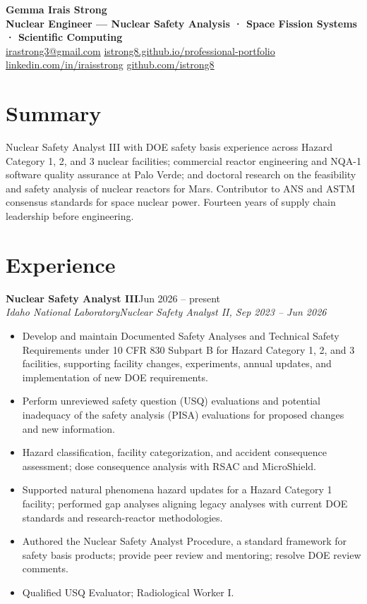 \documentclass[10pt,letterpaper]{article}
\newcommand{\role}[4]{%
  \textbf{#1}\hfill{\color{muted}#3}\\
  {\itshape #2}\hfill{\color{muted}\itshape #4}\par\vspace{1pt}}
\begin{document}
{\LARGE\bfseries Gemma Irais Strong}\\[2pt]
{\color{accent}\bfseries Nuclear Engineer — Nuclear Safety Analysis · Space Fission Systems · Scientific Computing}\\[3pt]
{\small
\href{mailto:irastrong3@gmail.com}{irastrong3@gmail.com} \textbar{}
\href{https://istrong8.github.io/professional-portfolio/}{istrong8.github.io/professional-portfolio} \textbar{}
\href{https://www.linkedin.com/in/iraisstrong/}{linkedin.com/in/iraisstrong} \textbar{}
\href{https://github.com/istrong8}{github.com/istrong8}}

\section{Summary}
Nuclear Safety Analyst III with DOE safety basis experience across Hazard Category 1, 2, and 3 nuclear facilities; commercial reactor engineering and NQA-1 software quality assurance at Palo Verde; and doctoral research on the feasibility and safety analysis of nuclear reactors for Mars. Contributor to ANS and ASTM consensus standards for space nuclear power. Fourteen years of supply chain leadership before engineering.

\section{Experience}
\role{Nuclear Safety Analyst III}{Idaho National Laboratory}{Jun 2026 -- present}{Nuclear Safety Analyst II, Sep 2023 -- Jun 2026}
\begin{itemize}
  \item Develop and maintain Documented Safety Analyses and Technical Safety Requirements under 10 CFR 830 Subpart B for Hazard Category 1, 2, and 3 facilities, supporting facility changes, experiments, annual updates, and implementation of new DOE requirements.
  \item Perform unreviewed safety question (USQ) evaluations and potential inadequacy of the safety analysis (PISA) evaluations for proposed changes and new information.
  \item Hazard classification, facility categorization, and accident consequence assessment; dose consequence analysis with RSAC and MicroShield.
  \item Supported natural phenomena hazard updates for a Hazard Category 1 facility; performed gap analyses aligning legacy analyses with current DOE standards and research-reactor methodologies.
  \item Authored the Nuclear Safety Analyst Procedure, a standard framework for safety basis products; provide peer review and mentoring; resolve DOE review comments.
  \item Qualified USQ Evaluator; Radiological Worker I.
\end{itemize}
\end{document}
